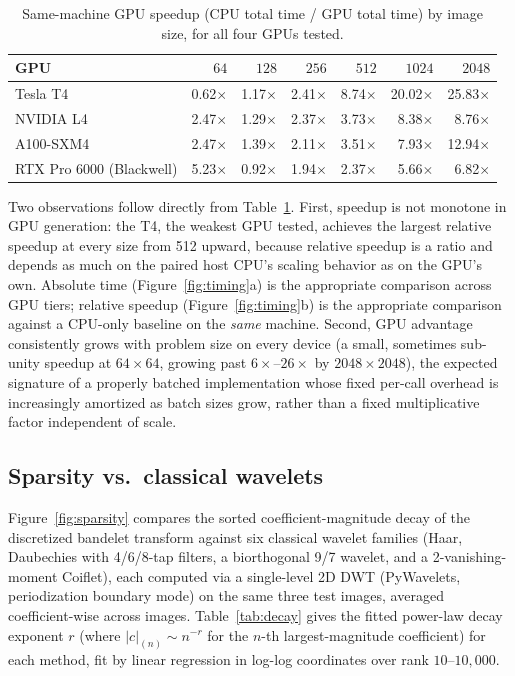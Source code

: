 \documentclass[11pt]{article}
\begin{document}
\begin{table}[t]
\centering
\caption{Same-machine GPU speedup (CPU total time / GPU total time) by
image size, for all four GPUs tested.}
\label{tab:speedup}
\begin{tabular}{lrrrrrr}
\toprule
GPU & $64$ & $128$ & $256$ & $512$ & $1024$ & $2048$ \\
\midrule
Tesla T4   & 0.62$\times$ & 1.17$\times$ & 2.41$\times$ & 8.74$\times$ & 20.02$\times$ & 25.83$\times$ \\
NVIDIA L4  & 2.47$\times$ & 1.29$\times$ & 2.37$\times$ & 3.73$\times$ & 8.38$\times$  & 8.76$\times$ \\
A100-SXM4  & 2.47$\times$ & 1.39$\times$ & 2.11$\times$ & 3.51$\times$ & 7.93$\times$  & 12.94$\times$ \\
RTX Pro 6000 (Blackwell) & 5.23$\times$ & 0.92$\times$ & 1.94$\times$ & 2.37$\times$ & 5.66$\times$ & 6.82$\times$ \\
\bottomrule
\end{tabular}
\end{table}

Two observations follow directly from Table~\ref{tab:speedup}. First,
speedup is not monotone in GPU generation: the T4, the weakest GPU tested,
achieves the largest relative speedup at every size from 512 upward, because
relative speedup is a ratio and depends as much on the paired host CPU's
scaling behavior as on the GPU's own. Absolute time (Figure~\ref{fig:timing}a)
is the appropriate comparison across GPU tiers; relative speedup
(Figure~\ref{fig:timing}b) is the appropriate comparison against a
CPU-only baseline on the \emph{same} machine. Second, GPU advantage
consistently grows with problem size on every device (a small, sometimes
sub-unity speedup at $64\times64$, growing past $6\times$--$26\times$ by
$2048\times2048$), the expected signature of a properly batched
implementation whose fixed per-call overhead is increasingly amortized as
batch sizes grow, rather than a fixed multiplicative factor independent of
scale.

\subsection{Sparsity vs.\ classical wavelets}
\label{sec:sparsity}

Figure~\ref{fig:sparsity} compares the sorted coefficient-magnitude decay of
the discretized bandelet transform against six classical wavelet families
(Haar, Daubechies with 4/6/8-tap filters, a biorthogonal 9/7 wavelet, and a
2-vanishing-moment Coiflet), each computed via a single-level 2D DWT
(PyWavelets, periodization boundary mode) on the same three test images,
averaged coefficient-wise across images. Table~\ref{tab:decay} gives the
fitted power-law decay exponent $r$ (where $|c|_{(n)} \sim n^{-r}$ for the
$n$-th largest-magnitude coefficient) for each method, fit by linear
regression in log-log coordinates over rank $10$--$10{,}000$.
\end{document}
